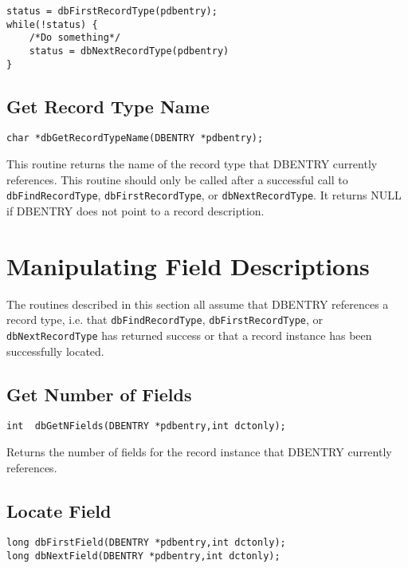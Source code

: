 \begin{verbatim}
status = dbFirstRecordType(pdbentry);
while(!status) {
    /*Do something*/
    status = dbNextRecordType(pdbentry)
}
\end{verbatim}

\subsection{Get Record Type Name}

\begin{verbatim}
char *dbGetRecordTypeName(DBENTRY *pdbentry);
\end{verbatim}

This routine returns the name of the record type that DBENTRY currently references. This routine should only be called 
after a successful call to \verb|dbFindRecordType|, \verb|dbFirstRecordType|, or \verb|dbNextRecordType|. It returns NULL if 
DBENTRY does not point to a record description.

\section{Manipulating Field Descriptions}

The routines described in this section all assume that DBENTRY references a record type, i.e. that 
\verb|dbFindRecordType|, \verb|dbFirstRecordType|, or \verb|dbNextRecordType| has returned success or that a record instance 
has been successfully located.

\subsection{Get Number of Fields}

\begin{verbatim}
int  dbGetNFields(DBENTRY *pdbentry,int dctonly);
\end{verbatim}

Returns the number of fields for the record instance that DBENTRY currently references.

\subsection{Locate Field}

\begin{verbatim}
long dbFirstField(DBENTRY *pdbentry,int dctonly);
long dbNextField(DBENTRY *pdbentry,int dctonly);
\end{verbatim}

